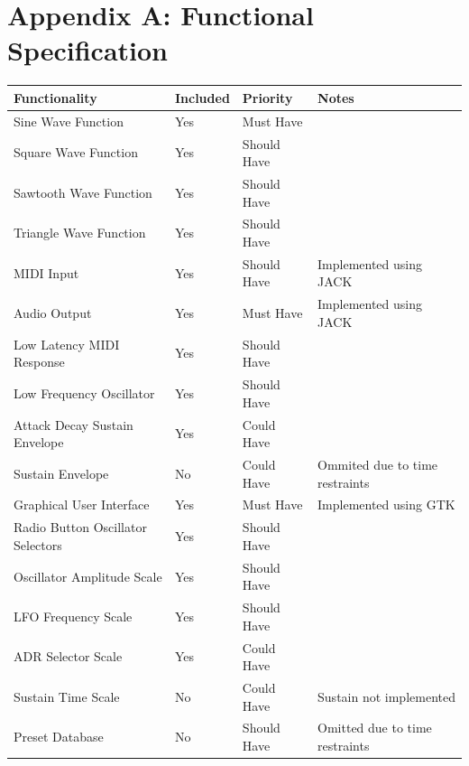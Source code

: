 \documentclass[11pt,a4paper]{article}
\begin{document}
\section{Appendix A: Functional Specification}
\begin{tabular}{ | l | l | l | p{5cm} | }
    \hline
    Functionality & Included & Priority & Notes \\ \hline
    Sine Wave Function & Yes & Must Have & \\ \hline
    Square Wave Function & Yes & Should Have & \\ \hline
    Sawtooth Wave Function & Yes & Should Have & \\ \hline
    Triangle Wave Function & Yes & Should Have & \\ \hline
    MIDI Input & Yes & Should Have & Implemented using JACK \\ \hline
    Audio Output & Yes & Must Have & Implemented using JACK \\ \hline
    Low Latency MIDI Response & Yes & Should Have & \\ \hline
    Low Frequency Oscillator & Yes & Should Have & \\ \hline
    Attack Decay Sustain Envelope & Yes & Could Have & \\ \hline
    Sustain Envelope & No & Could Have & Ommited due to time restraints \\ \hline
    Graphical User Interface & Yes & Must Have & Implemented using GTK \\ \hline
    Radio Button Oscillator Selectors & Yes & Should Have & \\ \hline
    Oscillator Amplitude Scale & Yes & Should Have & \\ \hline
    LFO Frequency Scale & Yes & Should Have & \\ \hline
    ADR Selector Scale & Yes & Could Have & \\ \hline
    Sustain Time Scale & No & Could Have & Sustain not implemented \\ \hline
    Preset Database & No & Should Have & Omitted due to time restraints \\
    \hline
\end{tabular}
\end{document}
